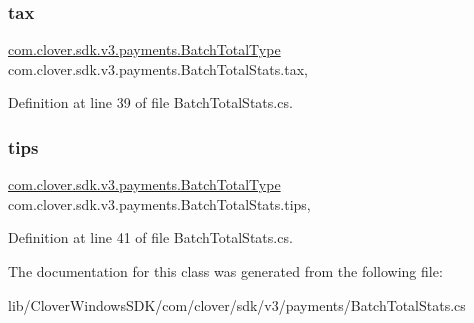 \subsubsection{\texorpdfstring{tax}{tax}}
{\footnotesize\ttfamily \hyperlink{classcom_1_1clover_1_1sdk_1_1v3_1_1payments_1_1_batch_total_type}{com.\+clover.\+sdk.\+v3.\+payments.\+Batch\+Total\+Type} com.\+clover.\+sdk.\+v3.\+payments.\+Batch\+Total\+Stats.\+tax\hspace{0.3cm}{\ttfamily [get]}, {\ttfamily [set]}}



Definition at line 39 of file Batch\+Total\+Stats.\+cs.

\mbox{\label{classcom_1_1clover_1_1sdk_1_1v3_1_1payments_1_1_batch_total_stats_aa829bb717b68c7522b6a27941c224509}} 
\subsubsection{\texorpdfstring{tips}{tips}}
{\footnotesize\ttfamily \hyperlink{classcom_1_1clover_1_1sdk_1_1v3_1_1payments_1_1_batch_total_type}{com.\+clover.\+sdk.\+v3.\+payments.\+Batch\+Total\+Type} com.\+clover.\+sdk.\+v3.\+payments.\+Batch\+Total\+Stats.\+tips\hspace{0.3cm}{\ttfamily [get]}, {\ttfamily [set]}}



Definition at line 41 of file Batch\+Total\+Stats.\+cs.



The documentation for this class was generated from the following file\+:\begin{DoxyCompactItemize}
\item 
lib/\+Clover\+Windows\+S\+D\+K/com/clover/sdk/v3/payments/Batch\+Total\+Stats.\+cs\end{DoxyCompactItemize}
